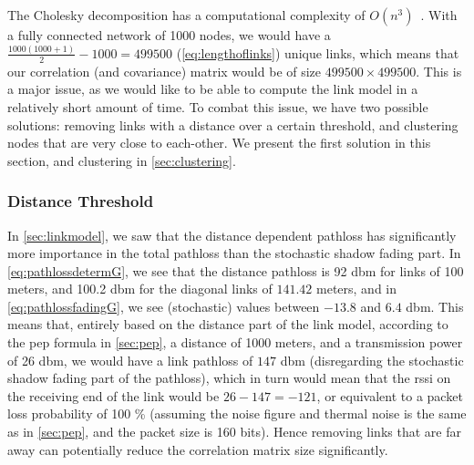 The Cholesky decomposition has a computational complexity of $O(n^3)$~\citationneeded. With a fully connected network of 1000 nodes, we would have a $\frac{1000(1000+1)}{2} - 1000 = 499500$ (\autoref{eq:lengthoflinks}) unique links, which means that our correlation (and covariance) matrix would be of size $499500 \times 499500$. This is a major issue, as we would like to be able to compute the link model in a relatively short amount of time. To combat this issue, we have two possible solutions: removing links with a distance over a certain threshold, and clustering nodes that are very close to each-other. We present the first solution in this section, and clustering in \autoref{sec:clustering}.\medbreak

\subsubsection{Distance Threshold}\label{sec:distancethreshold}
In \autoref{sec:linkmodel}, we saw that the distance dependent \gls{pathloss} has significantly more importance in the total \gls{pathloss} than the stochastic shadow fading part. In \autoref{eq:pathlossdetermG}, we see that the distance \gls{pathloss} is 92 \acrshort{dbm} for links of 100 meters, and 100.2 \acrshort{dbm} for the diagonal links of $141.42$ meters, and in \autoref{eq:pathlossfadingG}, we see (stochastic) values between $-13.8$ and $6.4$ \acrshort{dbm}. This means that, entirely based on the distance part of the link model, according to the \gls{pep} formula in \autoref{sec:pep}, a distance of 1000 meters, and a transmission power of 26 \acrshort{dbm}, we would have a link \gls{pathloss} of $147$ \acrshort{dbm} (disregarding the stochastic shadow fading part of the \gls{pathloss}), which in turn would mean that the \gls{rssi} on the receiving end of the link would be $26 - 147 = -121$, or equivalent to a packet loss probability of 100 \% (assuming the noise figure and thermal noise is the same as in \autoref{sec:pep}, and the packet size is 160 bits). Hence removing links that are far away can potentially reduce the correlation matrix size significantly.

